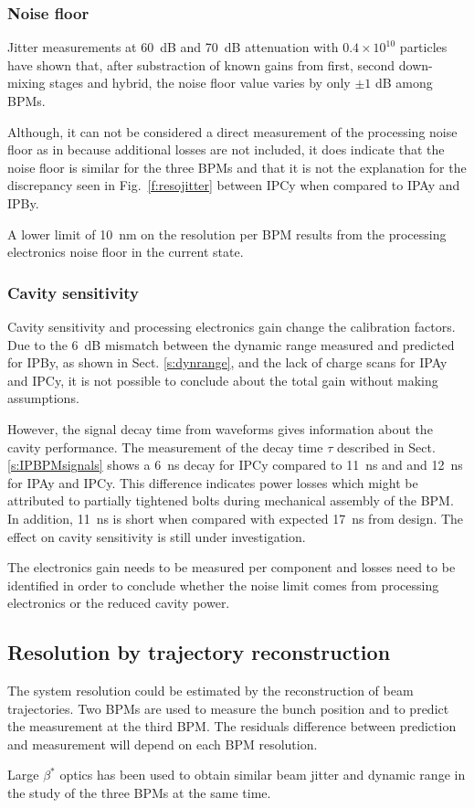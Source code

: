 \subsubsection{Noise floor}
Jitter measurements at 60~dB and 70~dB attenuation with $0.4\times10^{10}$ particles have shown that, after substraction of known gains from first, second down-mixing stages and hybrid, the noise floor value varies by only $\pm1$ dB among BPMs.\par
Although, it can not be considered a direct measurement of the processing noise floor as in \cite{PhysRevSTAB.11.062801} because additional losses are not included, it does indicate that the noise floor is similar for the three BPMs and that it is not the explanation for the discrepancy seen in Fig.~\ref{f:resojitter} between IPCy when compared to IPAy and IPBy.\par
A lower limit of 10~nm on the resolution per BPM results from the processing electronics noise floor in the current state.\par

\subsubsection{Cavity sensitivity}\label{s:resosensi}
Cavity sensitivity and processing electronics gain change the calibration factors. Due to the 6~dB mismatch between the dynamic range measured and predicted for IPBy, as shown in Sect. \ref{s:dynrange}, and the lack of charge scans for IPAy and IPCy, it is not possible to conclude about the total gain without making assumptions.\par
However, the signal decay time from waveforms gives information about the cavity performance. The measurement of the decay time $\tau$ described in Sect. \ref{s:IPBPMsignals} shows a 6~ns decay for IPCy compared to 11~ns and and 12~ns for IPAy and IPCy. This difference indicates power losses which might be attributed to partially tightened bolts during mechanical assembly of the BPM. In addition, 11~ns is short when compared with expected 17~ns from design. The effect on cavity sensitivity is still under investigation.\par
The electronics gain needs to be measured per component and losses need to be identified in order to conclude whether the noise limit comes from processing electronics or the reduced cavity power.

\subsection{Resolution by trajectory reconstruction}
The system resolution could be estimated by the reconstruction of beam trajectories. Two BPMs are used to measure the bunch position and to predict the measurement at the third BPM. The residuals difference between prediction and measurement will depend on each BPM resolution.\par
Large $\beta^*$ optics has been used to obtain similar beam jitter and dynamic range in the study of the three BPMs at the same time.\par
